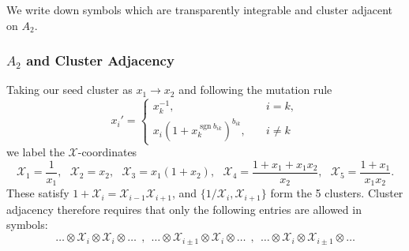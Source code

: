 \documentclass[12pt]{article}
\DeclareMathOperator{\sgn}{sgn}
\def\x{\mathcal{X}}
\begin{document}
\thispagestyle{fancyplain}
 
\fancyhf{}
 
\cfoot{\fancyplain{}{\thepage}}


\noindent We write down symbols which are transparently integrable and cluster adjacent on $A_2$. 

\subsubsection*{$A_2$ and Cluster Adjacency}
Taking our seed cluster as $x_1\to x_2$ and following the mutation rule
\begin{equation}
	x_{i}' =
	\begin{cases}
		x_{k}^{-1}, &\quad i=k,\\
		x_{i} (1+x_{k}^{\sgn b_{i k}})^{b_{i k}}, &\quad i \neq k
  	\end{cases}
\end{equation}
we label the $\x$-coordinates
\begin{equation}\label{def:xcoords}
	\x_1 = \frac{1}{x_1}, ~~~\x_2 = x_2,~~~ \x_3 = x_1 (1 + x_2),~~~ \x_4=\frac{1+x_1+x_1 x_2}{x_2},~~~ \x_5 = \frac{1+x_1}{x_1 x_2}.
\end{equation}
These satisfy $1+\x_i = \x_{i-1}\x_{i+1}$, and $\{1/\x_i, \x_{i+1}\}$ form the 5 clusters. Cluster adjacency therefore requires that only the following entries are allowed in symbols:
\begin{equation}
	\ldots\otimes\x_i\otimes\x_i\otimes\ldots~~,~~
	\ldots\otimes\x_{i\pm1}\otimes\x_i\otimes\ldots~~,~~
	\ldots\otimes\x_i\otimes\x_{i\pm1}\otimes\ldots
\end{equation}
\end{document}
